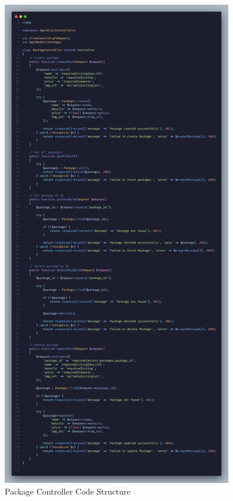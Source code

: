 \begin{figure}[H]
    \centering
    \includegraphics[width=0.9\textwidth]{./figures/implementation/Package_Controller.png}
    \caption{Package Controller Code Structure}
    \label{fig:package_controller}
\end{figure}

